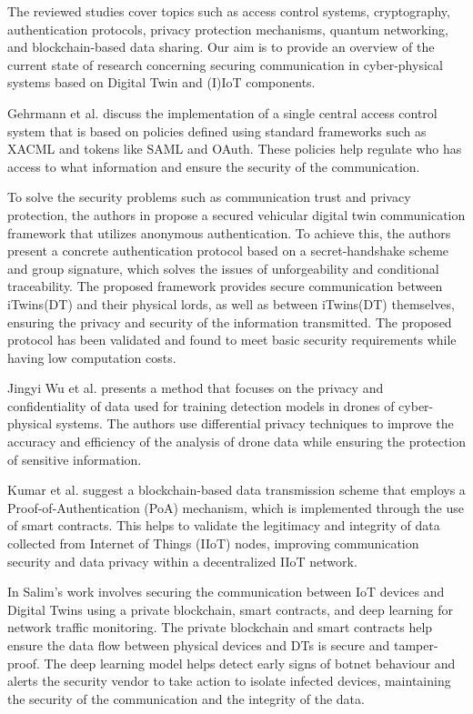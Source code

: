 The reviewed studies cover topics such as access control systems, cryptography, authentication protocols, privacy protection mechanisms, quantum networking, and blockchain-based data sharing. Our aim is to provide an overview of the current state of research concerning securing communication in cyber-physical systems based on Digital Twin and (I)IoT components.

Gehrmann et al.\cite{gehrmannDigitalTwinBased2020} discuss the implementation of a single central access control system that is based on policies defined using standard frameworks such as XACML and tokens like SAML and OAuth. These policies help regulate who has access to what information and ensure the security of the communication.  


To solve the security problems such as communication trust and privacy protection, the authors in\cite{xuEfficientAuthenticationVehicular2021} propose a secured vehicular digital twin communication framework that utilizes anonymous authentication. To achieve this, the authors present a concrete authentication protocol based on a secret-handshake scheme and group signature, which solves the issues of unforgeability and conditional traceability. The proposed framework provides secure communication between iTwins(DT) and their physical lords, as well as between iTwins(DT) themselves, ensuring the privacy and security of the information transmitted. The proposed protocol has been validated and found to meet basic security requirements while having low computation costs.  

Jingyi Wu et al.\cite{wuDeepLearningDriven2022} presents a method that focuses on the privacy and confidentiality of data used for training detection models in drones of cyber-physical systems. The authors use differential privacy techniques to improve the accuracy and efficiency of the analysis of drone data while ensuring the protection of sensitive information. 

Kumar et al.\cite{kumarBlockchainDeepLearning2022} suggest a blockchain-based data transmission scheme that employs a Proof-of-Authentication (PoA) mechanism, which is implemented through the use of smart contracts. This helps to validate the legitimacy and integrity of data collected from Internet of Things (IIoT) nodes, improving communication security and data privacy within a decentralized IIoT network.  

In \cite{salimBlockchainEnabledSecureDigital2022} Salim's work involves securing the communication between IoT devices and Digital Twins using a private blockchain, smart contracts, and deep learning for network traffic monitoring. The private blockchain and smart contracts help ensure the data flow between physical devices and DTs is secure and tamper-proof. The deep learning model helps detect early signs of botnet behaviour and alerts the security vendor to take action to isolate infected devices, maintaining the security of the communication and the integrity of the data.  


